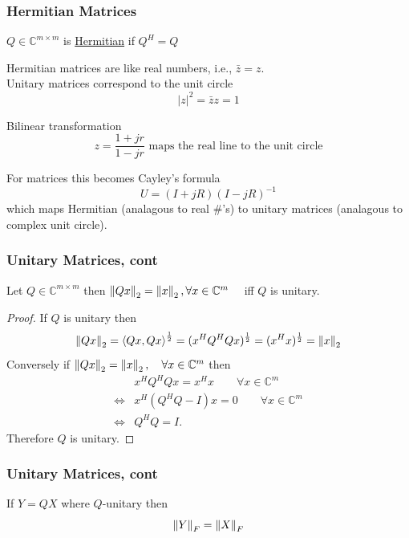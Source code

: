 \documentclass{beamer}
\begin{document}
\begin{frame}\frametitle{Hermitian Matrices}
	\begin{definition}
	$Q \in \mathbb{C}^{m \times m}$ is \underline{Hermitian} if $Q^H = Q$
	\end{definition}
	
	\vfill
	
	Hermitian matrices are like real numbers, i.e., $\bar{z} = z$.\\
	Unitary matrices correspond to the unit circle
	\[ |z|^2 = \bar{z}z = 1 \]

	\vfill
	
	Bilinear transformation
	\[ 
		z = \frac{1 + jr}{1 - jr} \text{ maps the real line to the unit circle} 
	\]
	
	For matrices this becomes Cayley's formula
	\[ 
		U = (I+jR)(I-jR)^{-1} 
	\]
	which maps Hermitian (analagous to real \#'s) to unitary matrices (analagous to complex unit circle).
\end{frame}

\begin{frame}\frametitle{Unitary Matrices, cont}
	\begin{lemma}
	Let $Q \in \mathbb{C}^{m \times m}$ then $\left\|Qx \right\|_2 = \left\|x \right\|_2,  \forall x \in \mathbb{C}^m~~~$ iff $Q$ is unitary.
	\end{lemma}
	
	\begin{proof}
		If $Q$ is unitary then
		\[
			\left\|Qx \right\|_2 = \left<Qx,Qx \right>^{\frac{1}{2}} = (x^HQ^HQx)^{\frac{1}{2}} = (x^Hx)^{\frac{1}{2}} = \left\|x \right\|_2 
		\]
		Conversely if $\left\|Qx \right\|_2 = \left\|x \right\|_2, \quad \forall x \in \mathbb{C}^m$ then
		\begin{align*}
			& x^HQ^HQx = x^Hx \qquad \forall x\in \mathbb{C}^m \\
			\iff & x^H(Q^HQ-I)x = 0 \qquad \forall x\in \mathbb{C}^m \\
			\iff & Q^HQ = I.
		\end{align*}
		Therefore $Q$ is unitary.
	\end{proof}
\end{frame}

\begin{frame}\frametitle{Unitary Matrices, cont}
	\begin{lemma}
	If $Y=QX$ where $Q$-unitary then 
	\[ \left\|Y \right\|_F = \left\|X \right\|_F \]
	\end{lemma}
\end{frame}
\end{document}
